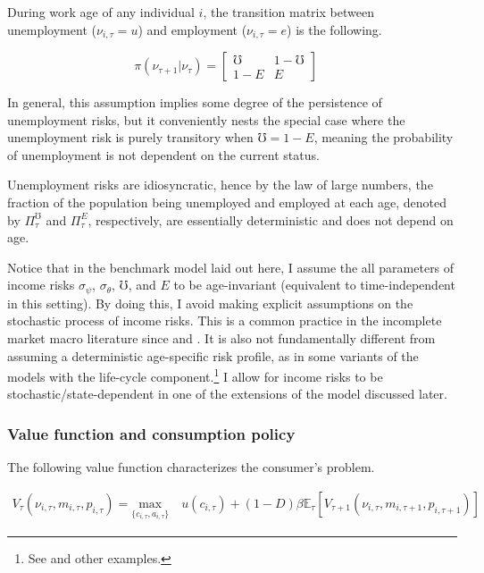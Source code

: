 During work age of any individual $i$, the transition matrix between unemployment ($\nu_{i,\tau}=u$) and employment ($\nu_{i,\tau} = e$) is the following.

\begin{equation}
\pi(\nu_{\tau+1}|\nu_{\tau})= 
    \begin{bmatrix} 
	\mho & 1-\mho  \\
	1-E & E
	\end{bmatrix}
	\quad
\end{equation}

In general, this assumption implies some degree of the persistence of unemployment risks, but it conveniently nests the special case where the unemployment risk is purely transitory when $\mho = 1-E$, meaning the probability of unemployment is not dependent on the current status. 


Unemployment risks are idiosyncratic, hence by the law of large numbers, the fraction of the population being unemployed and employed at each age, denoted by $\Pi^\mho_\tau$ and $\Pi^E_\tau$, respectively, are essentially deterministic and does not depend on age.  

Notice that in the benchmark model laid out here, I assume the all parameters of income risks $\sigma_\psi$, $\sigma_\theta$, $\mho$, and $E$ to be age-invariant (equivalent to time-independent in this setting). By doing this, I avoid making explicit assumptions on the stochastic process of income risks. This is a common practice in the incomplete market macro literature since    \cite{gourinchas2002consumption} and \cite{cagetti2003wealth}. It is also not fundamentally different from assuming a deterministic age-specific risk profile, as in some variants of the models with the life-cycle component.\footnote{See \cite{carroll2017distribution} and other examples.} I allow for income risks to be stochastic/state-dependent in one of the extensions of the model discussed later.

\subsubsection{Value function and consumption policy}

The following value function characterizes the  consumer's problem.

\begin{equation}
\begin{split}
V_{\tau}(\nu_{i,\tau}, m_{i,\tau}, p_{i,\tau}) = \underset{\{c_{i,\tau},a_{i,\tau}\}}{\textrm{max}} \quad u(c_{i,\tau}) + (1-D)\beta \mathbb{E}_{\tau}\left[V_{\tau+1}(\nu_{i,\tau},m_{i,\tau+1}, p_{i,\tau+1})\right] 
\end{split}
\end{equation}

